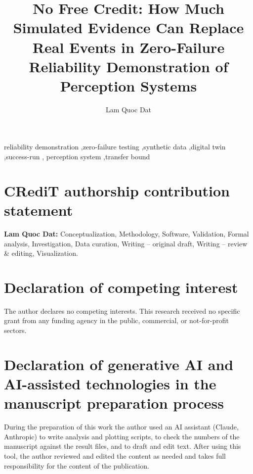 \documentclass[preprint,12pt]{elsarticle}
\theoremstyle{definition}
\theoremstyle{remark}
\begin{document}
\begin{frontmatter}
\title{No Free Credit: How Much Simulated Evidence Can Replace Real Events in Zero-Failure Reliability Demonstration of
Perception Systems}
\author{Lam Quoc Dat}

\begin{abstract}

\end{abstract}

\begin{keyword}
reliability demonstration \sep zero-failure testing \sep synthetic data \sep digital twin \sep success-run \sep
perception system \sep transfer bound
\end{keyword}
\end{frontmatter}

\linenumbers





\section*{CRediT authorship contribution statement}
\textbf{Lam Quoc Dat:} Conceptualization, Methodology, Software, Validation, Formal analysis, Investigation, Data
curation, Writing -- original draft, Writing -- review \& editing, Visualization.

\section*{Declaration of competing interest}
The author declares no competing interests. This research received no specific grant from any funding agency in the
public, commercial, or not-for-profit sectors.

\section*{Declaration of generative AI and AI-assisted technologies in the manuscript preparation process}
During the preparation of this work the author used an AI assistant (Claude, Anthropic) to write analysis and plotting
scripts, to check the numbers of the manuscript against the result files, and to draft and edit text. After using this
tool, the author reviewed and edited the content as needed and takes full responsibility for the content of the
publication.
\end{document}
